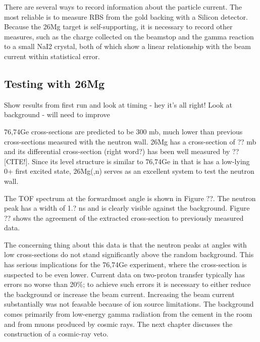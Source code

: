 There are several ways to record information about the particle current.  The most reliable is to measure RBS from the gold backing with a Silicon detector.  Because the 26Mg target is self-supporting, it is necessary to record other measures, such as the charge collected on the beamstop and the gamma reaction to a small NaI2 crystal, both of which show a linear relationship with the beam current within statistical error.



\subsection{Testing with 26Mg}
Show results from first run and look at timing - hey it's all right!
Look at background - will need to improve

76,74Ge cross-sections are predicted to be 300 mb, much lower than previous cross-sections measured with the neutron wall.  26Mg has a cross-section of ?? mb and its differential cross-section (right word?) has been well measured by ?? [CITE!].  Since its level structure is similar to 76,74Ge in that is has a low-lying 0+ first excited state, 26Mg(,n) serves as an excellent system to test the neutron wall.


The TOF spectrum at the forwardmost angle is shown in Figure ??.  The neutron peak has a width of 1.? ns and is clearly visible against the background.  Figure ?? shows the agreement of the extracted cross-section to previously measured data.



The concerning thing about this data is that the neutron peaks at angles with low cross-sections do not stand significantly above the random background.  This has serious implications for the 76,74Ge experiment, where the cross-section is suspected to be even lower.  Current data on two-proton transfer typically has errors no worse than 20\%; to achieve such errors it is necessary to either reduce the background or increase the beam current.  Increasing the beam current substantially was not feasable because of ion source limitations.  The background comes primarily from low-energy gamma radiation from the cement in the room and from muons produced by cosmic rays.  The next chapter discusses the construction of a cosmic-ray veto.

%
% 
% 
